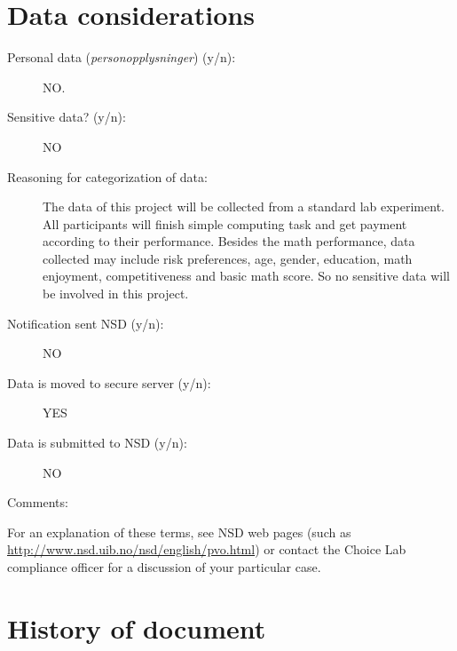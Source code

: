 \documentclass[a4paper,10pt]{article}
\begin{document}
\section*{Data considerations}

\begin{description}
\item[Personal data (\emph{personopplysninger}) (y/n):] NO.
\item[Sensitive data? (y/n):] NO
\item[Reasoning for categorization of data:] The data of this project will be collected from a standard lab experiment. All participants will finish simple computing task and get payment according to their performance. Besides the math performance, data collected may include risk preferences, age, gender, education, math enjoyment, competitiveness and basic math score. So no sensitive data will be involved in this project.
\item[Notification sent NSD (y/n):] NO 
\item[Data is moved to secure server (y/n):] YES
\item[Data is submitted to NSD (y/n):] NO
\item[Comments:] 
\end{description}

\medskip
\begin{small}
  \noindent For an explanation of these terms, see NSD web pages (such
  as \url{http://www.nsd.uib.no/nsd/english/pvo.html}) or contact the
  Choice Lab compliance officer for a discussion of your particular
  case.
\end{small}







\section*{History of document}
\end{document}
